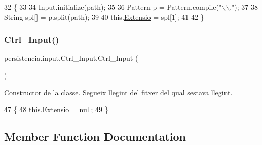\begin{DoxyCode}
32                                    \{
33   
34         Input.initialize(path);
35 
36         Pattern p = Pattern.compile(\textcolor{stringliteral}{"\(\backslash\)\(\backslash\)."});
37 
38         String spl[] = p.split(path);
39 
40         this.\hyperlink{classpersistencia_1_1input_1_1Ctrl__Input_a6041b56aa31f01f75d02382f98e259e5}{Extensio} = spl[1];
41 
42     \}
\end{DoxyCode}
\mbox{\label{classpersistencia_1_1input_1_1Ctrl__Input_a817ed61e715eb12261d844de34d84bec}} 
\subsubsection{\texorpdfstring{Ctrl\+\_\+\+Input()}{Ctrl\_Input()}\hspace{0.1cm}{\footnotesize\ttfamily [2/2]}}
{\footnotesize\ttfamily persistencia.\+input.\+Ctrl\+\_\+\+Input.\+Ctrl\+\_\+\+Input (\begin{DoxyParamCaption}{ }\end{DoxyParamCaption})\hspace{0.3cm}{\ttfamily [inline]}}



Constructor de la classe. Segueix llegint del fitxer del qual s\textquotesingle{}estava llegint. 


\begin{DoxyCode}
47                         \{
48         this.\hyperlink{classpersistencia_1_1input_1_1Ctrl__Input_a6041b56aa31f01f75d02382f98e259e5}{Extensio} = null;
49     \}
\end{DoxyCode}


\subsection{Member Function Documentation}
\mbox{\label{classpersistencia_1_1input_1_1Ctrl__Input_a5a94d207dce0fd592b5ac17f55154d4f}} 
